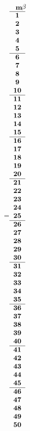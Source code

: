  =\hbox{$\begin{array}{c}
 \begin{picture}(13,5)(0,0)
 \put(13,0){\bf $ \beta$}
 \put(4,-1){\bf m}
 \end{picture} 
  \\ \hline 
\bf   1 \\ 
\bf   2 \\ 
\bf   3 \\ 
\bf   4 \\ 
\bf   5
  \\ \hline 
\bf   6 \\ 
\bf   7 \\ 
\bf   8 \\ 
\bf   9 \\ 
\bf  10
  \\ \hline 
\bf  11 \\ 
\bf  12 \\ 
\bf  13 \\ 
\bf  14 \\ 
\bf  15
  \\ \hline 
\bf  16 \\ 
\bf  17 \\ 
\bf  18 \\ 
\bf  19 \\ 
\bf  20
  \\ \hline 
\bf  21 \\ 
\bf  22 \\ 
\bf  23 \\ 
\bf  24 \\ 
\bf  25
  \\ \hline 
\bf  26 \\ 
\bf  27 \\ 
\bf  28 \\ 
\bf  29 \\ 
\bf  30
  \\ \hline 
\bf  31 \\ 
\bf  32 \\ 
\bf  33 \\ 
\bf  34 \\ 
\bf  35
  \\ \hline 
\bf  36 \\ 
\bf  37 \\ 
\bf  38 \\ 
\bf  39 \\ 
\bf  40
  \\ \hline 
\bf  41 \\ 
\bf  42 \\ 
\bf  43 \\ 
\bf  44 \\ 
\bf  45
  \\ \hline 
\bf  46 \\ 
\bf  47 \\ 
\bf  48 \\ 
\bf  49 \\ 
\bf  50
 \end{array}$}
